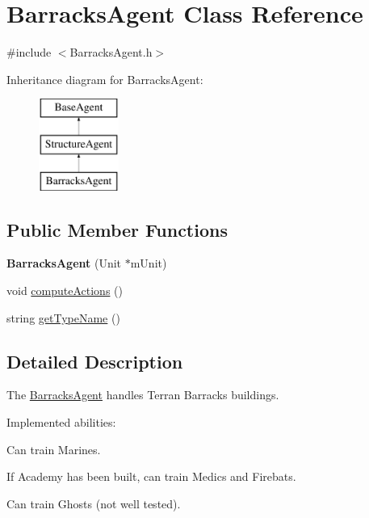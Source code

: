 \hypertarget{class_barracks_agent}{
\section{BarracksAgent Class Reference}
\label{class_barracks_agent}
}


{\ttfamily \#include $<$BarracksAgent.h$>$}

Inheritance diagram for BarracksAgent:\begin{figure}[H]
\begin{center}
\leavevmode
\includegraphics[height=3.000000cm]{class_barracks_agent}
\end{center}
\end{figure}
\subsection*{Public Member Functions}
\begin{DoxyCompactItemize}
\item 
\hypertarget{class_barracks_agent_aac36182fe21c1589b78001d54e9f0f5e}{
{\bfseries BarracksAgent} (Unit $\ast$mUnit)}
\label{class_barracks_agent_aac36182fe21c1589b78001d54e9f0f5e}

\item 
void \hyperlink{class_barracks_agent_ac203ebc549f2c8c176f5e8eb346a1c71}{computeActions} ()
\item 
string \hyperlink{class_barracks_agent_a852535051449f5aa1ec39c1c8a5fdbae}{getTypeName} ()
\end{DoxyCompactItemize}


\subsection{Detailed Description}
The \hyperlink{class_barracks_agent}{BarracksAgent} handles Terran Barracks buildings.

Implemented abilities:
\begin{DoxyItemize}
\item Can train Marines.
\item If Academy has been built, can train Medics and Firebats.
\item Can train Ghosts (not well tested).
\end{DoxyItemize}

